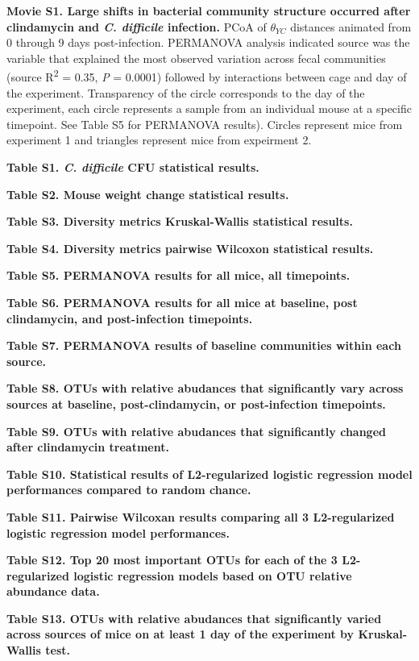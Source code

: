 \documentclass[11pt,]{article}
\begin{document}
\textbf{Movie S1. Large shifts in bacterial community structure occurred
after clindamycin and \emph{C. difficile} infection.} PCoA of
\(\theta_{YC}\) distances animated from 0 through 9 days post-infection.
PERMANOVA analysis indicated source was the variable that explained the
most observed variation across fecal communities (source
R\textsuperscript{2} = 0.35, \emph{P} = 0.0001) followed by interactions
between cage and day of the experiment. Transparency of the circle
corresponds to the day of the experiment, each circle represents a
sample from an individual mouse at a specific timepoint. See Table S5
for PERMANOVA results). Circles represent mice from experiment 1 and
triangles represent mice from expeirment 2.

\textbf{Table S1. \emph{C. difficile} CFU statistical results.}

\textbf{Table S2. Mouse weight change statistical results.}

\textbf{Table S3. Diversity metrics Kruskal-Wallis statistical results.}

\textbf{Table S4. Diversity metrics pairwise Wilcoxon statistical
results.}

\textbf{Table S5. PERMANOVA results for all mice, all timepoints.}

\textbf{Table S6. PERMANOVA results for all mice at baseline, post
clindamycin, and post-infection timepoints.}

\textbf{Table S7. PERMANOVA results of baseline communities within each
source.}

\textbf{Table S8. OTUs with relative abudances that significantly vary
across sources at baseline, post-clindamycin, or post-infection
timepoints.}

\textbf{Table S9. OTUs with relative abudances that significantly
changed after clindamycin treatment.}

\textbf{Table S10. Statistical results of L2-regularized logistic
regression model performances compared to random chance.}

\textbf{Table S11. Pairwise Wilcoxan results comparing all 3
L2-regularized logistic regression model performances.}

\textbf{Table S12. Top 20 most important OTUs for each of the 3
L2-regularized logistic regression models based on OTU relative
abundance data.}

\textbf{Table S13. OTUs with relative abudances that significantly
varied across sources of mice on at least 1 day of the experiment by
Kruskal-Wallis test.}
\end{document}
